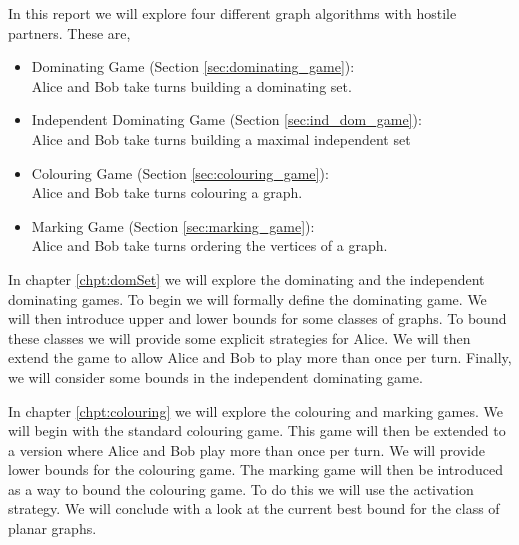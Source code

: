 In this report 
we will explore four different graph algorithms with hostile partners. These are,
\begin{itemize}
    \item Dominating Game (Section \ref{sec:dominating_game}): \\
        Alice and Bob take turns building a dominating set.
    \item Independent Dominating Game (Section \ref{sec:ind_dom_game}): \\
        Alice and Bob take turns building a maximal independent set    
    \item Colouring Game (Section \ref{sec:colouring_game}): \\
        Alice and Bob take turns colouring a graph.
    \item Marking Game (Section \ref{sec:marking_game}): \\
        Alice and Bob take turns ordering the vertices of a graph.
\end{itemize}

In chapter \ref{chpt:domSet} we will explore the dominating and the independent dominating games. To begin we  will formally define the dominating game. We will then introduce upper and lower bounds for some classes of graphs. To bound these classes we will provide some explicit strategies for Alice. We will then extend the game to allow Alice and Bob to play more than once per turn. Finally, we will consider some bounds in the independent dominating game.

In chapter \ref{chpt:colouring} we will explore the colouring and marking games. We will begin with the standard colouring game. This game will then be extended to a version where Alice and Bob play more than once per turn. We will provide lower bounds for the colouring game. The marking game will then be introduced as a way to bound the colouring game. To do this we will use the activation strategy. We will conclude with a look at the current best bound for the class of planar graphs.




    
